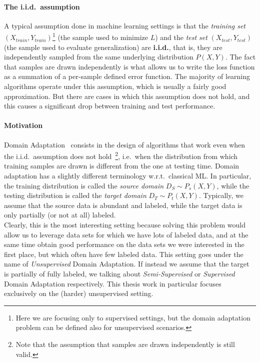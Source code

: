 \documentclass[../main.tex]{subfiles}
\begin{document}
    \paragraph{The i.i.d.\ assumption}
    A typical assumption done in machine learning settings is that the \textit{training set}
    $( X_{train}, Y_{train} )$\footnote{Here we are focusing only to supervised settings, but the domain adaptation problem
    can be defined also for unsupervised scenarios.} (the sample used to minimize $L$) and the \textit{test set} $( X_{test}, Y_{test} )$
    (the sample used to evaluate generalization) are \textbf{i.i.d.}, that is, they are independently sampled from the same
    underlying distribution $P(X, Y)$. The fact that samples are drawn independently is what allows us to write the loss function
    as a summation of a per-sample defined error function.
    The majority of learning algorithms operate under this assumption, which is usually a fairly good
    approximation. But there are cases in which this assumption does not hold, and this causes a significant drop between
    training and test performance.

    \paragraph{Motivation}
    Domain Adaptation~\cite{domain-adaptation-review} consists in the design of algorithms that work even when the i.i.d.\
    assumption does not hold~\footnote{Note that the assumption that samples are drawn independently is still valid.},
    i.e.\ when the distribution from which training samples are drawn is different from the one at testing time. 
    Domain adaptation has a slightly different terminology w.r.t.\ classical ML\@. In particular, the training distribution
    is called the \textit{source domain} $D_{S} \sim P_{s}(X, Y)$, while the testing distribution is called the
    \textit{target domain} $D_{T} \sim P_{t}(X, Y)$.
    Typically, we assume that the source data is abundant and labeled, while the target data is only partially (or not at all) labeled. \\
    Clearly, this is the most interesting setting because solving this problem would allow us to leverage data sets for
    which we have lots of labeled data, and at the same time obtain good performance on the data sets we were interested in the first
    place, but which often have few labeled data. This setting goes under the name of \textit{Unsupervised} Domain Adaptation. If instead
    we assume that the target is partially of fully labeled, we talking about \textit{Semi-Supervised} or \textit{Supervised} Domain
    Adaptation respectively. This thesis work in particular focuses exclusively on the (harder) unsupervised setting.
\end{document}
